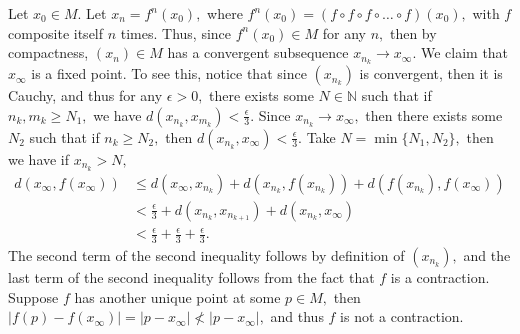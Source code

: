 \documentclass[11pt]{article}
\newcommand{\bbN}{\mathbb{N}}
\begin{document}
\begin{enumerate}
\begin{reflection}
        Let $x_0 \in M.$ Let $x_n = f^n(x_0),$ where $f^n(x_0) = (f\circ f\circ f\circ \dots \circ f)(x_0),$ with $f$ composite itself $n$ times. Thus, since $f^n(x_0)\in M$ for any $n,$ then by compactness, $(x_n)\in M$ has a convergent subsequence $x_{n_k} \to x_{\infty}.$ We claim that $x_{\infty}$ is a fixed point. To see this, notice that since $(x_{n_k})$ is convergent, then it is Cauchy, and thus for any $\epsilon>0,$ there exists some $N\in \bbN$ such that if $n_k, m_k \geq N_1,$ we have $d(x_{n_k}, x_{m_k}) < \frac{\epsilon}{3}.$ Since $x_{n_k}\to x_\infty,$ then there exists some $N_2$ such that if $n_k\geq N_2,$ then $d(x_{n_k}, x_\infty)< \frac{\epsilon}{3}.$ Take $N = \min\{N_1, N_2\},$ then we have if $x_{n_k}> N,$
        \begin{align*}
          d(x_\infty, f(x_\infty))&\leq d(x_\infty, x_{n_k}) + d(x_{n_k}, f(x_{n_k})) + d(f(x_{n_k}), f(x_{\infty}))\\
          &< \frac{\epsilon}{3} + d(x_{n_k}, x_{n_{k+1}}) + d(x_{n_k}, x_\infty)\\
          &< \frac{\epsilon}{3} + \frac{\epsilon}{3} + \frac{\epsilon}{3}.
        \end{align*}
        The second term of the second inequality follows by definition of $(x_{n_k}),$ and the last term of the second inequality follows from the fact that $f$ is a contraction. Suppose $f$ has another unique point at some $p \in M,$ then $|f(p) - f(x_\infty)| = |p - x_\infty|\not < |p-x_\infty|,$ and thus $f$ is not a contraction.
    \end{reflection}
\end{enumerate}

\newpage
\end{document}

